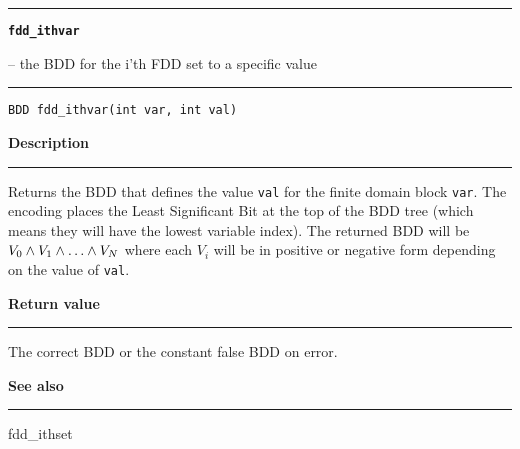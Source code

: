 \begin{minipage}{\textwidth}

\noindent\begin{minipage}{\textwidth}
\rule{\textwidth}{0.5mm}
{\tt\bf fdd\_ithvar }
\--- the BDD for the i'th FDD set to a specific value  \hspace{\fill}
\\\rule[1.5ex]{\textwidth}{0.5mm}
\end{minipage}

\noindent\begin{verbatim}
BDD fdd_ithvar(int var, int val) 
\end{verbatim}

\vspace{\parsep}\noindent
{\bf Description}\\\rule[1.5ex]{\textwidth}{0.2mm}\vspace{-1.5ex}\setlength{\parindent}{1em}
Returns the BDD that defines the value {\tt val} for the
           finite domain block {\tt var}. The encoding places the
	   Least Significant Bit at the top of the BDD tree
	   (which means they will have the lowest variable index).
	   The returned BDD will be $V_0 \wedge V_1 \wedge \ldots
	   \wedge V_N$ where each $V_i$ will be in positive or negative form
	   depending on the value of {\tt val}. 

\setlength{\parindent}{0em}\vspace{\parsep}\vspace{\baselineskip}\noindent
{\bf Return value}\\\rule[1.5ex]{\textwidth}{0.2mm}\vspace{-1.5ex}
The correct BDD or the constant false BDD on error. 

\vspace{\parsep}\vspace{\baselineskip}\noindent
{\bf See also}\\\rule[1.5ex]{\textwidth}{0.2mm}\vspace{-1.5ex}
fdd\_ithset 
\end{minipage}
\vspace{8ex}
